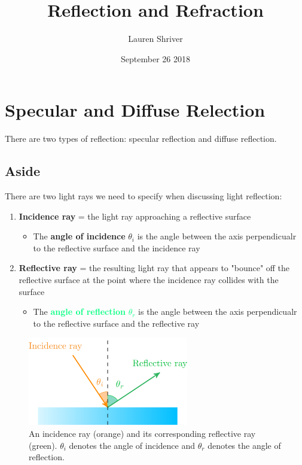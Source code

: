 \documentclass[a4paper]{article}
\title{Reflection and Refraction}
\author{Lauren Shriver}
\date{September 26 2018}
\begin{document}
\maketitle

\section*{Specular and Diffuse Relection}
There are two types of reflection: specular reflection and diffuse reflection. 
\subsection*{Aside}
There are two light rays we need to specify when discussing light reflection:
\begin{enumerate}
    \item \textbf{Incidence ray} = the light ray approaching a reflective surface
        \begin{itemize}
            \item The \textcolor{burntorange}{\textbf{angle of incidence} $\theta_i$} is the angle between the axis perpendicualr to the reflective surface and the incidence ray 
        \end{itemize}
    \item \textbf{Reflective ray} = the resulting light ray that appears to "bounce" off the reflective surface at the point where the incidence ray collides with the surface 
        \begin{itemize}
            \item The \textcolor{springgreen}{\textbf{angle of reflection} $\theta_r$} is the angle between the axis perpendicualr to the reflective surface and the reflective ray 
        \end{itemize}
\end{enumerate}
\begin{figure}[htp!]
        \centering
        \includegraphics[width=7cm]{incidence_refractive.png}
        \caption{An incidence ray (orange) and its corresponding reflective ray (green). $\theta_i$ denotes the angle of incidence and $\theta_r$ denotes the angle of reflection.}
        \label{fig:inci_refrac}
\end{figure}
\end{document}
